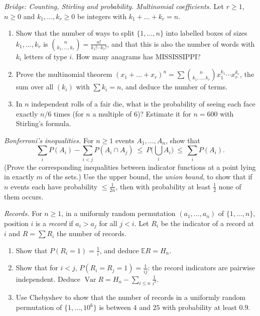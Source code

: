 \begin{exercise}[$\star\star$]\label{ex:multinomial}
\emph{Bridge: Counting, Stirling and probability.}
\emph{Multinomial coefficients.} Let $r\ge1$, $n\ge0$ and $k_1,\ldots,k_r\ge0$ be integers with $k_1+\dots+k_r=n$.
\begin{enumerate}[label=(\alph*)]
\item Show that the number of ways to split $\{1,\dots,n\}$ into labelled boxes of sizes $k_1,\dots,k_r$ is $\binom n{k_1,\dots,k_r}=\frac{n!}{k_1!\cdots k_r!}$, and that this is also the number of words with $k_i$ letters of type $i$. How many anagrams has MISSISSIPPI?
\item Prove the multinomial theorem $(x_1+\dots+x_r)^n=\sum\binom n{k_1,\dots,k_r}x_1^{k_1}\cdots x_r^{k_r}$, the sum over all $(k_i)$ with $\sum k_i=n$, and deduce the number of terms.
\item In $n$ independent rolls of a fair die, what is the probability of seeing each face exactly $n/6$ times (for $n$ a multiple of $6$)? Estimate it for $n=600$ with Stirling's formula.
\end{enumerate}
\end{exercise}

\begin{exercise}[$\star\star$]\label{ex:bonferroni}
\emph{Bonferroni's inequalities.} For $n\ge1$ events $A_1,\dots,A_n$, show that
\[
\sum_iP(A_i)-\sum_{i<j}P(A_i\cap A_j)\ \le\ P\Big(\bigcup_iA_i\Big)\ \le\ \sum_iP(A_i).
\]
(Prove the corresponding inequalities between indicator functions at a point lying in exactly $m$ of the sets.) Use the upper bound, the \emph{union bound}, to show that if $n$ events each have probability $\le\frac1{2n}$, then with probability at least $\frac12$ none of them occurs.
\end{exercise}

\begin{exercise}[$\star\star$]\label{ex:records}
\emph{Records.} For $n\ge1$, in a uniformly random permutation $(a_1,\dots,a_n)$ of $\{1,\dots,n\}$, position $i$ is a \emph{record} if $a_i>a_j$ for all $j<i$. Let $R_i$ be the indicator of a record at $i$ and $R=\sum R_i$ the number of records.
\begin{enumerate}[label=(\alph*)]
\item Show that $P(R_i=1)=\frac1i$, and deduce $\mathbb ER=H_n$.
\item Show that for $i<j$, $P(R_i=R_j=1)=\frac1{ij}$: the record indicators are pairwise independent. Deduce $\operatorname{Var}R=H_n-\sum_{i\le n}\frac1{i^2}$.
\item Use Chebyshev to show that the number of records in a uniformly random permutation of $\{1,\ldots,10^6\}$ is between $4$ and $25$ with probability at least $0.9$.
\end{enumerate}
\end{exercise}

